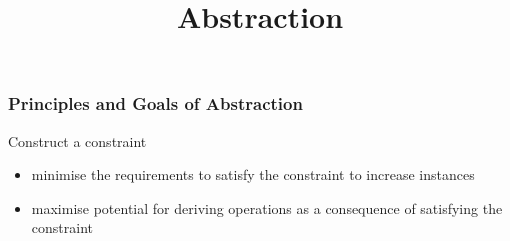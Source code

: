 {


  \begin{frame}[plain] 
  \title{Abstraction}
  
  \vspace{3em}

  \begin{TitleBoxAbstraction}
    \begin{center}
    {\Large \inserttitle}
    \end{center}
  \end{TitleBoxAbstraction}

  \end{frame}
}



\begin{frame}
\frametitle{Principles and Goals of Abstraction}
\begin{block}{Construct a constraint}
\begin{itemize}
  \item minimise the requirements to satisfy the constraint to increase instances
  \item maximise potential for deriving operations as a consequence of satisfying the constraint 
\end{itemize}
\end{block}
\end{frame}


